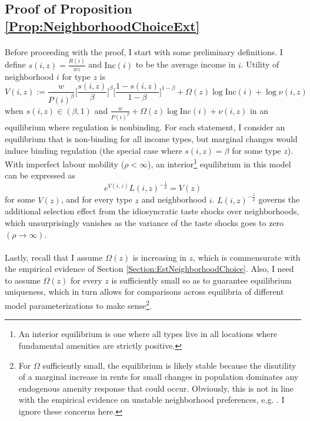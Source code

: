 \documentclass[12pt]{article}
\begin{document}
	
	
	\clearpage
	\subsection{Proof of Proposition \ref{Prop:NeighborhoodChoiceExt}}\label{Proof:NeighborhoodChoiceExt}
	
	\paragraph*{}
	Before proceeding with the proof, I start with some preliminary definitions. I define $s(i, z) = \frac{R(i)}{wz}$ and $\text{Inc}(i)$ to be the average income in $i$. Utility of neighborhood $i$ for type $z$ is $$V(i, z) := \frac{w}{P(i)^{\beta}}\bigg[\frac{s(i, z)}{\beta}\bigg]^{\beta}\bigg[\frac{1 - s(i, z)}{1 - \beta}\bigg]^{1 - \beta} + \Omega(z)\log \text{Inc}(i) + \log \nu(i, z)$$ when $s(i, z) \in (\beta, 1)$ and $\frac{w}{P(i)^{\beta}} + \Omega(z)\log \text{Inc}(i) + \nu(i, z)$ in an equilibrium where regulation is nonbinding. For each statement, I consider an equilibrium that is non-binding for all income types, but marginal changes would induce binding regulation (the special case where $s(i, z) = \beta$ for some type $z$). With imperfect labour mobility ($\rho < \infty$), an interior\footnote{An interior equilibrium is one where all types live in all locations where fundamental amenities are strictly positive. } equilibrium in this model can be expressed as 
	\begin{equation}\label{AppendixEq:EquilibriumPropNCE}
		e^{V(i, z)}L(i, z)^{-\frac{1}{\rho}} = V(z)
	\end{equation}
	for some $V(z)$, and for every type $z$ and neighborhood $i$. $L(i, z)^{-\frac{1}{\rho}}$ governs the additional selection effect from the idiosyncratic taste shocks over neighborhoods, which unsurprisingly vanishes as the variance of the taste shocks goes to zero $(\rho \to \infty)$. 
	
	\paragraph*{}
	Lastly, recall that I assume $\Omega(z)$ is increasing in $z$, which is commensurate with the empirical evidence of Section \ref{Section:EstNeighborhoodChoice}. Also, I need to assume $\Omega(z)$ for every $z$ is sufficiently small so as to guarantee equilibrium uniqueness, which in turn allows for comparisons across equilibria of different model parameterizations to make sense\footnote{For $\Omega$ sufficiently small, the equilibrium is likely stable because the disutility of a marginal increase in rents for small changes in population dominates any endogenous amenity response that could occur. Obviously, this is not in line with the empirical evidence on unstable neighborhood preferences, e.g. \citep{davisetalracepref}. I ignore these concerns here.}.
	
\end{document}

